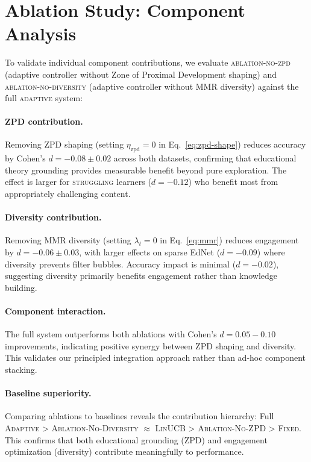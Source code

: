 \section{Ablation Study: Component Analysis}
\label{app:ablation}

To validate individual component contributions, we evaluate \textsc{ablation-no-zpd} (adaptive controller without Zone of Proximal Development shaping) and \textsc{ablation-no-diversity} (adaptive controller without MMR diversity) against the full \textsc{adaptive} system:

\paragraph{ZPD contribution.} Removing ZPD shaping (setting $\eta_{\mathrm{zpd}} = 0$ in Eq.~\eqref{eq:zpd-shape}) reduces accuracy by Cohen's $d = -0.08 \pm 0.02$ across both datasets, confirming that educational theory grounding provides measurable benefit beyond pure exploration. The effect is larger for \textsc{struggling} learners ($d = -0.12$) who benefit most from appropriately challenging content.

\paragraph{Diversity contribution.} Removing MMR diversity (setting $\lambda_t = 0$ in Eq.~\eqref{eq:mmr}) reduces engagement by $d = -0.06 \pm 0.03$, with larger effects on sparse EdNet ($d = -0.09$) where diversity prevents filter bubbles. Accuracy impact is minimal ($d = -0.02$), suggesting diversity primarily benefits engagement rather than knowledge building.

\paragraph{Component interaction.} The full system outperforms both ablations with Cohen's $d = 0.05-0.10$ improvements, indicating positive synergy between ZPD shaping and diversity. This validates our principled integration approach rather than ad-hoc component stacking.

\paragraph{Baseline superiority.} Comparing ablations to baselines reveals the contribution hierarchy: Full \textsc{Adaptive} > \textsc{Ablation-No-Diversity} $\approx$ \textsc{LinUCB} > \textsc{Ablation-No-ZPD} > \textsc{Fixed}. This confirms that both educational grounding (ZPD) and engagement optimization (diversity) contribute meaningfully to performance.

